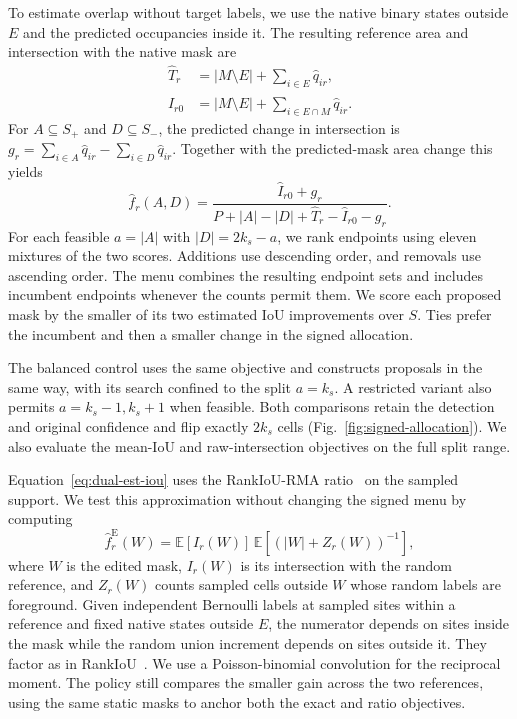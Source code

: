 \documentclass[journal]{IEEEtran}
\begin{document}
To estimate overlap without target labels, we use the native binary states outside \(E\) and the predicted occupancies inside it. The resulting reference area and intersection with the native mask are
\begin{equation}
\begin{aligned}
 \hat T_r&=|M\setminus E|+\sum_{i\in E}\hat q_{ir},\\
 \hat I_{r0}&=|M\setminus E|+\sum_{i\in E\cap M}\hat q_{ir}.
\end{aligned}
\label{eq:dual-area-proxy}
\end{equation}
For \(A\subseteq S_+\) and \(D\subseteq S_-\), the predicted change in intersection is \(g_r=\sum_{i\in A}\hat q_{ir}-\sum_{i\in D}\hat q_{ir}\). Together with the predicted-mask area change this yields
\begin{equation}
 \hat f_r(A,D)=
 \frac{\hat I_{r0}+g_r}{P+|A|-|D|+\hat T_r-\hat I_{r0}-g_r}.
 \label{eq:dual-est-iou}
\end{equation}
For each feasible \(a=|A|\) with \(|D|=2k_s-a\), we rank endpoints using eleven mixtures of the two scores. Additions use descending order, and removals use ascending order. The menu combines the resulting endpoint sets and includes incumbent endpoints whenever the counts permit them. We score each proposed mask by the smaller of its two estimated IoU improvements over \(S\). Ties prefer the incumbent and then a smaller change in the signed allocation.

The balanced control uses the same objective and constructs proposals in the same way, with its search confined to the split \(a=k_s\). A restricted variant also permits \(a=k_s-1,k_s+1\) when feasible. Both comparisons retain the detection and original confidence and flip exactly \(2k_s\) cells (Fig.~\ref{fig:signed-allocation}). We also evaluate the mean-IoU and raw-intersection objectives on the full split range.

Equation~\eqref{eq:dual-est-iou} uses the RankIoU-RMA ratio~\cite{rankrma} on the sampled support. We test this approximation without changing the signed menu by computing
\begin{equation}
 \hat f^{\mathrm{E}}_r(W)=\mathbb{E}[I_r(W)]\,
     \mathbb{E}\!\left[(|W|+Z_r(W))^{-1}\right],
 \label{eq:exact-iou-signed}
\end{equation}
where \(W\) is the edited mask, \(I_r(W)\) is its intersection with the random reference, and \(Z_r(W)\) counts sampled cells outside \(W\) whose random labels are foreground. Given independent Bernoulli labels at sampled sites within a reference and fixed native states outside \(E\), the numerator depends on sites inside the mask while the random union increment depends on sites outside it. They factor as in RankIoU~\cite{rankseg}. We use a Poisson-binomial convolution for the reciprocal moment. The policy still compares the smaller gain across the two references, using the same static masks to anchor both the exact and ratio objectives.
\end{document}
